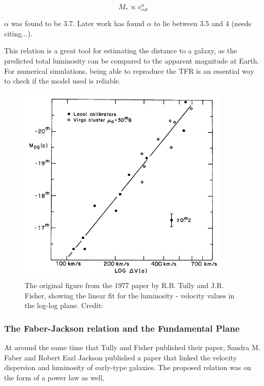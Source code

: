 \begin{equation}
    M_* \propto v_{rot}^\alpha 
\end{equation}

$\alpha$ was found to be 3.7. Later work has found $\alpha$ to lie between 3.5 and 4 (needs citing...).

This relation is a great tool for estimating the distance to a galaxy, as the predicted total luminosity can be compared to the apparent magnitude at Earth. For numerical simulations, being able to reproduce the TFR is an essential way to check if the model used is reliable.

\begin{figure}
    \centering
    \includegraphics[width=0.9\textwidth]{images/tully_fisher.png}
    \caption{The original figure from the 1977 paper by R.B. Tully and J.R. Fisher, showing the linear fit for the luminosity - velocity values in the log-log plane. Credit: \cite{TullyFisher1977}}
    \label{tully_fisher}
\end{figure}

\subsubsection{The Faber-Jackson relation and the Fundamental Plane}
At around the same time that Tully and Fisher published their paper, Sandra M. Faber and Robert Earl Jackson published a paper that linked the velocity dispersion and luminosity of early-type galaxies. The proposed relation was on the form of a power law as well,

